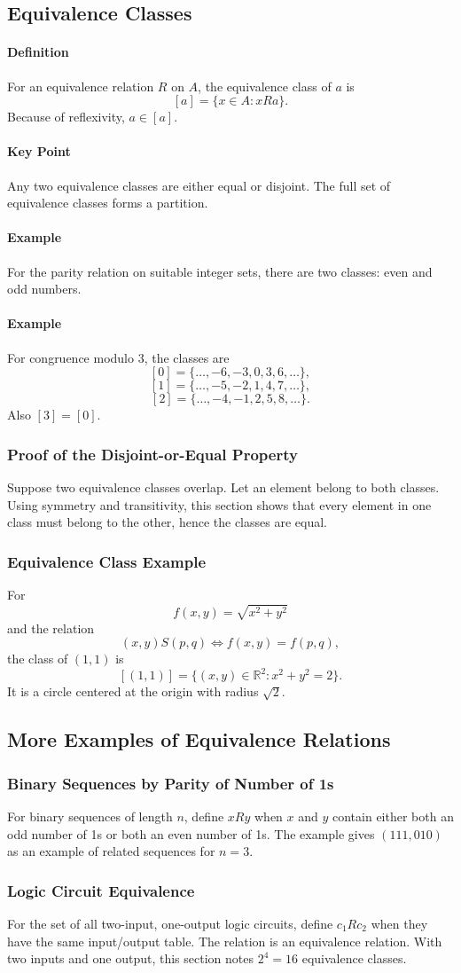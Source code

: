 \documentclass[12pt]{article}
\newcommand{\Definition}{\paragraph{Definition}}
\newcommand{\Example}{\paragraph{Example}}
\newcommand{\KeyPoint}{\paragraph{Key Point}}
\begin{document}
\subsection{Equivalence Classes}
\Definition For an equivalence relation $R$ on $A$, the equivalence class of $a$ is
\[
[a]=\{x\in A:xRa\}.
\]
Because of reflexivity, $a\in[a]$.

\KeyPoint Any two equivalence classes are either equal or disjoint. The full set of equivalence classes forms a partition.

\Example For the parity relation on suitable integer sets, there are two classes: even and odd numbers.

\Example For congruence modulo 3, the classes are
\[
[0]=\{\ldots,-6,-3,0,3,6,\ldots\},
\]
\[
[1]=\{\ldots,-5,-2,1,4,7,\ldots\},
\]
\[
[2]=\{\ldots,-4,-1,2,5,8,\ldots\}.
\]
Also $[3]=[0]$.

\subsubsection{Proof of the Disjoint-or-Equal Property}
Suppose two equivalence classes overlap. Let an element belong to both classes. Using symmetry and transitivity, this section shows that every element in one class must belong to the other, hence the classes are equal.

\subsubsection{Equivalence Class Example}
For
\[
f(x,y)=\sqrt{x^2+y^2}
\]
and the relation
\[
(x,y)S(p,q)\iff f(x,y)=f(p,q),
\]
the class of $(1,1)$ is
\[
[(1,1)]=\{(x,y)\in\mathbb R^2:x^2+y^2=2\}.
\]
It is a circle centered at the origin with radius $\sqrt2$.

\subsection{More Examples of Equivalence Relations}

\subsubsection{Binary Sequences by Parity of Number of 1s}
For binary sequences of length $n$, define $xRy$ when $x$ and $y$ contain either both an odd number of 1s or both an even number of 1s. The example gives $(111,010)$ as an example of related sequences for $n=3$.

\subsubsection{Logic Circuit Equivalence}
For the set of all two-input, one-output logic circuits, define $c_1Rc_2$ when they have the same input/output table. The relation is an equivalence relation. With two inputs and one output, this section notes $2^4=16$ equivalence classes.
\end{document}
